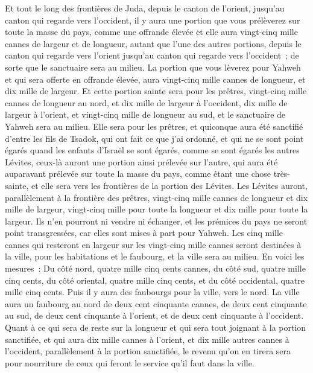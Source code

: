 \begin{multicols}{2}
Et tout le long des frontières de Juda, depuis le canton de l'orient, jusqu'au canton qui regarde vers l'occident, il y aura une portion que vous prélèverez sur toute la masse du pays, comme une offrande élevée et elle aura vingt-cinq mille cannes de largeur et de longueur, autant que l'une des autres portions, depuis le canton qui regarde vers l'orient jusqu'au canton qui regarde vers l'occident~; de sorte que le sanctuaire sera au milieu.
La portion que vous lèverez pour Yahweh et qui sera offerte en offrande élevée, aura vingt-cinq mille cannes de longueur, et dix mille de largeur.
Et cette portion sainte sera pour les prêtres, vingt-cinq mille cannes de longueur au nord, et dix mille de largeur à l'occident, dix mille de largeur à l'orient, et vingt-cinq mille de longueur au sud, et le sanctuaire de Yahweh sera au milieu.
Elle sera pour les prêtres, et quiconque aura été sanctifié d'entre les fils de Tsadok, qui ont fait ce que j'ai ordonné, et qui ne se sont point égarés quand les enfants d'Israël se sont égarés, comme se sont égarés les autres Lévites,
ceux-là auront une portion ainsi prélevée sur l'autre, qui aura été auparavant prélevée sur toute la masse du pays, comme étant une chose très-sainte, et elle sera vers les frontières de la portion des Lévites.
Les Lévites auront, parallèlement à la frontière des prêtres, vingt-cinq mille cannes de longueur et dix mille de largeur, vingt-cinq mille pour toute la longueur et dix mille pour toute la largeur.
Ils n'en pourront ni vendre ni échanger, et les prémices du pays ne seront point transgressées, car elles sont mises à part pour Yahweh.
Les cinq mille cannes qui resteront en largeur sur les vingt-cinq mille cannes seront destinées à la ville, pour les habitations et le faubourg, et la ville sera au milieu.
En voici les mesures~: Du côté nord, quatre mille cinq cents cannes, du côté sud, quatre mille cinq cents, du côté oriental, quatre mille cinq cents, et du côté occidental, quatre mille cinq cents.
Puis il y aura des faubourgs pour la ville, vers le nord. La ville aura un faubourg au nord de deux cent cinquante cannes, de deux cent cinquante au sud, de deux cent cinquante à l'orient, et de deux cent cinquante à l'occident.
Quant à ce qui sera de reste sur la longueur et qui sera tout joignant à la portion sanctifiée, et qui aura dix mille cannes à l'orient, et dix mille autres cannes à l'occident, parallèlement à la portion sanctifiée, le revenu qu'on en tirera sera pour nourriture de ceux qui feront le service qu'il faut dans la ville.

\end{multicols}
